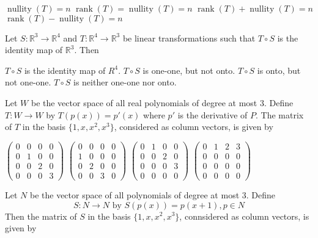 \documentclass[10pt]{exam}
\DeclareMathOperator{\rank}{\text{rank}}
\DeclareMathOperator{\nullity}{\text{nullity}}
\newcommand{\R}{\ensuremath{\mathbb{R}}}
\begin{document}
\begin{questions}
\begin{choices}
\choice $\nullity(T)=n$
\choice $\rank(T)=\nullity(T)=n$
\choice $\rank(T)+\nullity(T)=n$
\choice $\rank(T)-\nullity(T)=n$
\end{choices}

\question
Let $S:\R^3 \rightarrow \R^4$ and $T:\R^4 \rightarrow \R^3$ be linear transformations such that $T \circ S$ is the identity map of
$\R^3$. Then

\begin{choices}
\choice $T \circ S$ is the identity map of $R^4$.
\choice $T \circ S$ is one-one, but not onto.
\choice $T \circ S$ is onto, but not one-one.
\choice $T \circ S$ is neither one-one nor onto.
\end{choices}

\question
Let $W$ be the vector space of all real polynomials of degree at most 3. Define $T:W \rightarrow W$ by $T(p(x))=p'(x)$ where $p'$ is
the derivative of $P$. The matrix of $T$ in the basis $\{1,x,x^2,x^3\}$, considered as column vectors, is given by

\begin{oneparchoices}
\choice $ \begin{pmatrix}
0 & 0 & 0 & 0 \\ 
0 & 1 & 0 & 0 \\ 
0 & 0 & 2 & 0 \\ 
0 & 0 & 0 & 3
\end{pmatrix} $
\choice $ \begin{pmatrix}
0 & 0 & 0 & 0 \\ 
1 & 0 & 0 & 0 \\ 
0 & 2 & 0 & 0 \\ 
0 & 0 & 3 & 0
\end{pmatrix} $
\choice $ \begin{pmatrix}
0 & 1& 0 & 0 \\ 
0 & 0 & 2 & 0 \\ 
0 & 0 & 0 & 3 \\ 
0 & 0 & 0 & 0
\end{pmatrix} $
\choice $ \begin{pmatrix}
0 & 1 & 2 & 3 \\ 
0 & 0 & 0 & 0 \\ 
0 & 0 & 0 & 0 \\ 
0 & 0 & 0 & 0
\end{pmatrix} $
\end{oneparchoices}

\question
Let $N$ be the vector space of all polynomials of degree at most 3. Define
$$S:N \rightarrow N \text{ by } S(p(x))=p(x+1), p\in N$$
Then the matrix of $S$ in the basis $\{1,x,x^2,x^3\}$, connsidered as column vectors, is given by


\end{questions}
\end{document}
